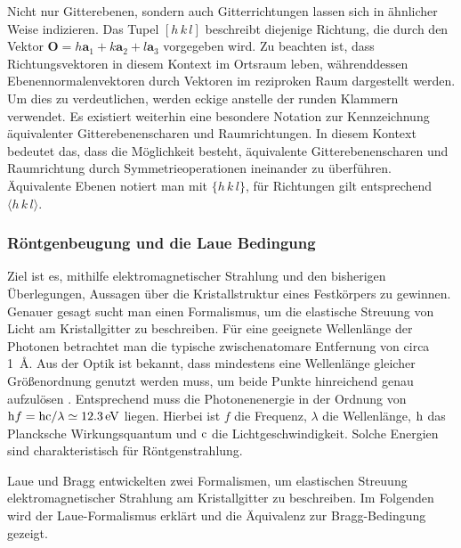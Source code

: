 Nicht nur Gitterebenen, sondern auch Gitterrichtungen lassen sich in ähnlicher Weise indizieren.
Das Tupel $[h\,k\,l]$ beschreibt diejenige Richtung, die durch den Vektor $\mathbf{O} = h\mathbf{a}_{1}+k\mathbf{a}_{2}+
l\mathbf{a}_{3}$ vorgegeben wird.
Zu beachten ist, dass Richtungsvektoren in diesem Kontext im Ortsraum leben,
währenddessen Ebenennormalenvektoren durch Vektoren im reziproken Raum dargestellt werden.
Um dies zu verdeutlichen, werden eckige anstelle der runden Klammern verwendet.
Es existiert weiterhin eine besondere Notation zur Kennzeichnung äquivalenter Gitterebenenscharen und Raumrichtungen.
In diesem Kontext bedeutet das, dass die Möglichkeit besteht, äquivalente Gitterebenenscharen und Raumrichtung durch
Symmetrieoperationen ineinander zu überführen.
Äquivalente Ebenen notiert man mit $\{h \,k\, l \}$, für Richtungen gilt entsprechend $\langle h\, k \, l \rangle$.

\subsubsection{Röntgenbeugung und die Laue Bedingung}
Ziel ist es, mithilfe elektromagnetischer Strahlung und den bisherigen Überlegungen, Aussagen über die
Kristallstruktur eines Festkörpers zu gewinnen.
Genauer gesagt sucht man einen Formalismus, um die elastische Streuung von Licht am Kristallgitter zu beschreiben.
Für eine geeignete Wellenlänge der Photonen betrachtet man die typische zwischenatomare Entfernung von circa
\qty{1}{\angstrom}.
Aus der Optik ist bekannt, dass mindestens eine Wellenlänge gleicher Größenordnung genutzt werden
muss, um beide Punkte hinreichend genau aufzulösen \autocite{Ashcroft}.
Entsprechend muss die Photonenenergie in der Ordnung von
$\mathrm{h} f =\mathrm{h} \mathrm{c} / \lambda \simeq \qty{12.3}{\electronvolt}$ liegen.
Hierbei ist $f$ die Frequenz, $\lambda$ die Wellenlänge, $\mathrm{h}$ das Plancksche Wirkungsquantum und $\mathrm{c}$ die
Lichtgeschwindigkeit.
Solche Energien sind charakteristisch für Röntgenstrahlung.

Laue und Bragg entwickelten zwei Formalismen, um elastischen Streuung elektromagnetischer Strahlung am Kristallgitter
zu beschreiben.
Im Folgenden wird der Laue-Formalismus erklärt und die Äquivalenz zur Bragg-Bedingung gezeigt.

